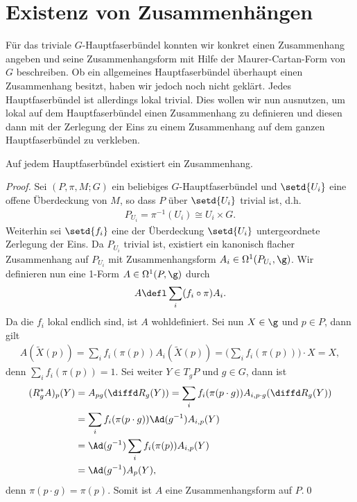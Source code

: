 \documentclass[%
	paper=a5,%
	fleqn,%
	DIV=18,%
	BCOR=0mm,
	fontsize=11pt,
	titlepage=false,%
	bibliography=totoc,
	DIV=18,%
	twoside=true,
	pdftitle=Riemannsche Geometrie,
	pdfauthor=Uwe Semmelmann,
	numbers=noendperiod]%
	{scrbook}
\begin{document}
\section{Existenz von Zusammenhängen}

Für das triviale $G$-Hauptfaserbündel konnten wir konkret einen Zusammenhang
angeben und seine Zusammenhangsform mit Hilfe der Maurer-Cartan-Form von $G$
beschreiben. Ob ein allgemeines Hauptfaserbündel überhaupt einen Zusammenhang
besitzt, haben wir jedoch noch nicht geklärt. Jedes Hauptfaserbündel ist allerdings
lokal trivial. Dies wollen wir nun ausnutzen, um lokal auf dem
Hauptfaserbündel einen Zusammenhang zu definieren und diesen dann mit der
Zerlegung der Eins zu einem Zusammenhang auf dem ganzen Hauptfaserbündel zu
verkleben.

\begin{prop}
Auf jedem Hauptfaserbündel existiert ein Zusammenhang.\fish
\end{prop}
\begin{proof}
Sei $(P,\pi,M;G)$ ein beliebiges $G$-Hauptfaserbündel und $\setd{U_i}$ eine
offene Überdeckung von $M$, so dass $P$ über $\setd{U_i}$ trivial ist, d.h.
\begin{align*}
P_{U_i} = \pi^{-1}(U_i) \cong U_i \times G.
\end{align*}
Weiterhin sei $\setd{f_i}$ eine der Überdeckung $\setd{U_i}$ untergeordnete
Zerlegung der Eins. Da $P_{U_i}$ trivial ist, existiert ein kanonisch
flacher Zusammenhang auf $P_{U_i}$ mit Zusammenhangsform $A_i\in
\Omega^1(P_{U_i},\g)$. Wir definieren nun eine 1-Form $A\in\Omega^1(P,\g)$
durch
\begin{align*}
A\defl \sum_{i} (f_i\circ \pi) A_i.
\end{align*}
Da die $f_i$ lokal endlich sind, ist $A$ wohldefiniert. Sei nun $X\in\g$
und $p\in P$, dann gilt
\begin{align*}
A(\tilde{X}(p))
= \sum_i f_i(\pi(p)) A_i(\tilde{X}(p))
= \biggl(\sum_i f_i(\pi(p))\biggr)\cdot X
= X,
\end{align*}
denn $\sum_i f_i(\pi(p)) = 1$. Sei weiter $Y\in T_gP$ und $g\in G$, dann
ist
\begin{align*}
(R_g^* A)_p (Y) &= A_{pg}(\diffd R_g(Y))
= \sum_i f_i(\pi(p\cdot g)) A_{i,p\cdot g}(\diffd R_g(Y))\\
&= \sum_i f_i(\pi(p\cdot g)) \Ad(g^{-1})A_{i,p}(Y)\\
&= \Ad(g^{-1})\sum_i f_i(\pi(p)) A_{i,p}(Y)\\
&= \Ad(g^{-1})A_p(Y),
\end{align*}
denn $\pi(p\cdot g) = \pi(p)$. Somit ist $A$ eine Zusammenhangsform auf $P$.\qed
\end{proof}
\end{document}
